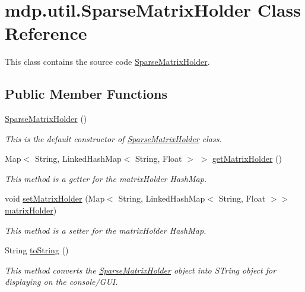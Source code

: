 \hypertarget{classmdp_1_1util_1_1_sparse_matrix_holder}{}\section{mdp.\+util.\+Sparse\+Matrix\+Holder Class Reference}
\label{classmdp_1_1util_1_1_sparse_matrix_holder}


This class contains the source code \hyperlink{classmdp_1_1util_1_1_sparse_matrix_holder}{Sparse\+Matrix\+Holder}.  


\subsection*{Public Member Functions}
\begin{DoxyCompactItemize}
\item 
\hyperlink{classmdp_1_1util_1_1_sparse_matrix_holder_a684bbebe963a3cfcb5cb6b32907c3260}{Sparse\+Matrix\+Holder} ()
\begin{DoxyCompactList}\small\item\em This is the default constructor of \hyperlink{classmdp_1_1util_1_1_sparse_matrix_holder}{Sparse\+Matrix\+Holder} class. \end{DoxyCompactList}\item 
Map$<$ String, Linked\+Hash\+Map$<$ String, Float $>$ $>$ \hyperlink{classmdp_1_1util_1_1_sparse_matrix_holder_a8ac92ce5890ca5a09f44e336a22dd8e8}{get\+Matrix\+Holder} ()
\begin{DoxyCompactList}\small\item\em This method is a getter for the matrix\+Holder Hash\+Map. \end{DoxyCompactList}\item 
void \hyperlink{classmdp_1_1util_1_1_sparse_matrix_holder_aaabfe2c2e01ca5d1af831c409ff6db45}{set\+Matrix\+Holder} (Map$<$ String, Linked\+Hash\+Map$<$ String, Float $>$$>$ \hyperlink{classmdp_1_1util_1_1_sparse_matrix_holder_a3d366c32341591c38a025f75ef755401}{matrix\+Holder})
\begin{DoxyCompactList}\small\item\em This method is a setter for the matrix\+Holder Hash\+Map. \end{DoxyCompactList}\item 
String \hyperlink{classmdp_1_1util_1_1_sparse_matrix_holder_a6f116c63e74de1050e05edf04a97b31f}{to\+String} ()
\begin{DoxyCompactList}\small\item\em This method converts the \hyperlink{classmdp_1_1util_1_1_sparse_matrix_holder}{Sparse\+Matrix\+Holder} object into S\+Tring object for displaying on the console/\+G\+U\+I. \end{DoxyCompactList}\end{DoxyCompactItemize}
